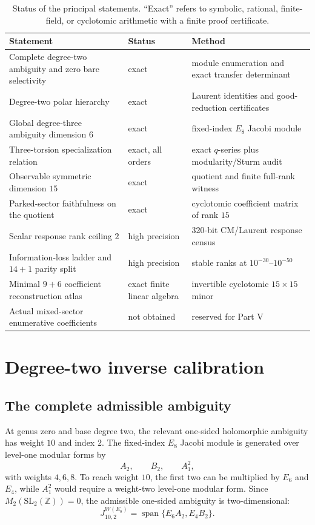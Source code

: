 \documentclass[11pt]{article}
\theoremstyle{definition}
\theoremstyle{remark}
\newcommand{\Span}{\operatorname{span}}
\begin{document}
\begin{table}[ht]
\centering
\small
\begin{tabular}{p{}p{}p{}}
\toprule
Statement & Status & Method \\
\midrule
Complete degree-two ambiguity and zero bare selectivity & exact & module enumeration and exact transfer determinant \\
Degree-two polar hierarchy & exact & Laurent identities and good-reduction certificates \\
Global degree-three ambiguity dimension $6$ & exact & fixed-index $E_8$ Jacobi module \\
Three-torsion specialization relation & exact, all orders & exact $q$-series plus modularity/Sturm audit \\
Observable symmetric dimension $15$ & exact & quotient and finite full-rank witness \\
Parked-sector faithfulness on the quotient & exact & cyclotomic coefficient matrix of rank $15$ \\
Scalar response rank ceiling $2$ & high precision & 320-bit CM/Laurent response census \\
Information-loss ladder and $14+1$ parity split & high precision & stable ranks at $10^{-30}$--$10^{-50}$ \\
Minimal $9+6$ coefficient reconstruction atlas & exact finite linear algebra & invertible cyclotomic $15\times15$ minor \\
Actual mixed-sector enumerative coefficients & not obtained & reserved for Part V \\
\bottomrule
\end{tabular}
\caption{Status of the principal statements.  ``Exact'' refers to symbolic, rational, finite-field, or cyclotomic arithmetic with a finite proof certificate.}
\label{tab:status}
\end{table}

\section{Degree-two inverse calibration}

\subsection{The complete admissible ambiguity}

At genus zero and base degree two, the relevant one-sided holomorphic ambiguity has weight $10$ and index $2$.  The fixed-index $E_8$ Jacobi module is generated over level-one modular forms by
\[
A_2,\qquad B_2,\qquad A_1^2,
\]
with weights $4,6,8$.  To reach weight $10$, the first two can be multiplied by $E_6$ and $E_4$, while $A_1^2$ would require a weight-two level-one modular form.  Since $M_2(\mathrm{SL}_2(\mathbb Z))=0$, the admissible one-sided ambiguity is two-dimensional:
\begin{equation}\label{eq:degree2module}
J^{W(E_8)}_{10,2}=\Span\{E_6A_2,E_4B_2\}.
\end{equation}
\end{document}
